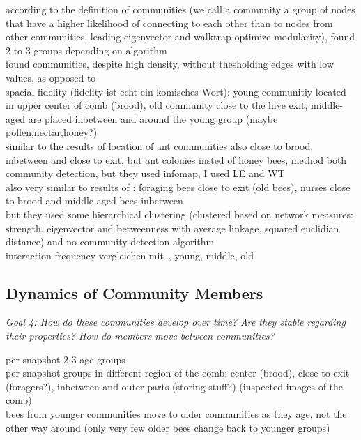 according to the definition of communities (we call a community a group of nodes that have a higher likelihood of connecting to each other than to nodes from other communities, leading eigenvector and walktrap optimize modularity), found 2 to 3 groups depending on algorithm\\
found communities, despite high density, without thesholding edges with low values, as opposed to~\textcite{mersch2013tracking}\\
spacial fidelity (fidelity ist echt ein komisches Wort): young communitiy located in upper center of comb (brood), old community close to the hive exit, middle-aged are placed inbetween and around the young group (maybe pollen,nectar,honey?)\\
similar to the results of \textcite{mersch2013tracking} location of ant communities also close to brood, inbetween and close to exit, but ant colonies insted of honey bees, method both community detection, but they used infomap, I used LE and WT\\
also very similar to results of \textcite{baracchi2014socio}: foraging bees close to exit (old bees), nurses close to brood and middle-aged bees inbetween\\
but they used some hierarchical clustering (clustered based on network measures: strength, eigenvector and betweenness with average linkage, squared euclidian distance) and no community detection algorithm\\
interaction frequency vergleichen mit~\textcite{scholl2011olfactory}, young, middle, old\\


\subsection{Dynamics of Community Members}
\emph{Goal 4:
How do these communities develop over time?
Are they stable regarding their properties?
How do members move between communities?}

per snapshot 2-3 age groups\\
per snapshot groups in different region of the comb: center (brood), close to exit (foragers?), inbetween and outer parts (storing stuff?) (inspected images of the comb)\\
bees from younger communities move to older communities as they age, not the other way around (only very few older bees change back to younger groups)

